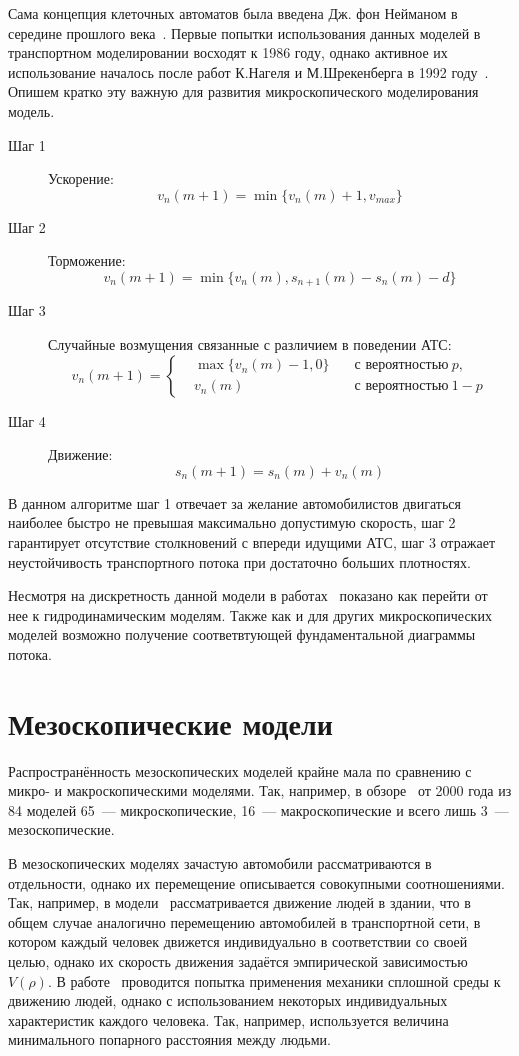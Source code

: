 Сама концепция клеточных автоматов была введена Дж. фон Нейманом в середине прошлого века~\cite{neiman2010dj}.
Первые попытки использования данных моделей в транспортном моделировании восходят к 1986 году, однако активное их использование началось после работ К.Нагеля и М.Шрекенберга в 1992 году~\cite{nagel1992cellular}.
Опишем кратко эту важную для развития микроскопического моделирования модель.

\begin{description}
  \item[Шаг 1] Ускорение:
    \[
        v_n(m+1) = \min\{v_n(m) + 1, v_{max}\}
    \]
  \item[Шаг 2] Торможение:
    \[
        v_n(m+1) = \min\{v_n(m), s_{n+1}(m) - s_n(m) - d\}
    \]
  \item[Шаг 3] Случайные возмущения связанные с различием в поведении АТС:
    \[
        v_n(m+1) =
        \left\{
        \begin{alignedat}{3}
            &\max\{v_n(m) - 1, 0\} \quad&\text{с вероятностью}\ p,  \\
            &v_n(m) \quad&\text{с вероятностью}\ 1 - p
        \end{alignedat}
        \right.
    \]
  \item[Шаг 4] Движение:
    \[
        s_n(m+1) = s_n(m) + v_n(m)
    \]
\end{description}
В данном алгоритме шаг 1 отвечает за желание автомобилистов двигаться наиболее быстро не превышая максимально допустимую скорость, шаг 2 гарантирует отсутствие столкновений с впереди идущими АТС, шаг 3 отражает неустойчивость транспортного потока при достаточно больших плотностях.

Несмотря на дискретность данной модели в работах~\cite{benassi1987hydrodynamical} показано как перейти от нее к гидродинамическим моделям.
Также как и для других микроскопических моделей возможно получение соответвтующей фундаментальной диаграммы потока.

\section{Мезоскопические модели}\label{subsec:ch1/sec3}
Распространённость мезоскопических моделей крайне мала по сравнению с микро- и макроскопическими моделями.
Так, например, в обзоре~\cite{boxill2000evaluation} от 2000 года из 84 моделей 65~--- микроскопические, 16~--- макроскопические и всего лишь 3~--- мезоскопические.

В мезоскопических моделях зачастую автомобили рассматриваются в отдельности, однако их перемещение описывается совокупными соотношениями.
Так, например, в модели~\cite{lovaas1994modeling} рассматривается движение людей в здании, что в общем случае аналогично перемещению автомобилей в транспортной сети, в котором каждый человек движется индивидуально в соответствии со своей целью, однако их скорость движения задаётся эмпирической зависимостью \(V(\rho)\).
В работе~\cite{treuille2006continuum} проводится попытка применения механики сплошной среды к движению людей, однако с использованием некоторых индивидуальных характеристик каждого человека. Так, например, используется величина минимального попарного расстояния между людьми.

